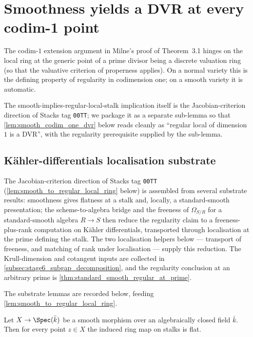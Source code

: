 \section{Smoothness yields a DVR at every codim-1 point}
\label{sec:smooth_dvr}

The codim-\(1\) extension argument in Milne's proof of Theorem~3.1 hinges on the local
ring at the generic point of a prime divisor being a discrete valuation ring (so that
the valuative criterion of properness applies). On a normal variety this is the
defining property of regularity in codimension one; on a smooth variety it is automatic.

The smooth-implies-regular-local-stalk implication itself is the Jacobian-criterion
direction of Stacks tag \texttt{00TT}; we package it as a separate sub-lemma so that
\cref{lem:smooth_codim_one_dvr} below reads cleanly as ``regular local of dimension
\(1\) is a DVR'', with the regularity prerequisite supplied by the sub-lemma.

\subsection{K\"ahler-differentials localisation substrate}
\label{subsec:kaehler_localisation_substrate}

The Jacobian-criterion direction of Stacks tag \texttt{00TT}
(\cref{lem:smooth_to_regular_local_ring} below) is assembled from several
substrate results: smoothness gives flatness at a stalk and, locally, a
standard-smooth presentation; the scheme-to-algebra bridge and the freeness of
\(\Omega_{S/R}\) for a standard-smooth algebra \(R \to S\) then reduce the
regularity claim to a freeness-plus-rank computation on K\"ahler differentials,
transported through localisation at the prime defining the stalk. The two
localisation helpers below --- transport of freeness, and matching of rank under
localisation --- supply this reduction. The Krull-dimension and cotangent inputs
are collected in \cref{subsec:stage6_subgap_decomposition}, and the regularity
conclusion at an arbitrary prime is \cref{thm:standard_smooth_regular_at_prime}.

The substrate lemmas are recorded below, feeding
\cref{lem:smooth_to_regular_local_ring}.

\begin{lemma}
  \label{lem:stalkMap_flat_of_smooth}
  Let \(X \to \Spec(\bar k)\) be a smooth morphism over an algebraically closed
  field \(\bar k\). Then for every point \(z \in X\) the induced ring map on
  stalks is flat.
\end{lemma}

